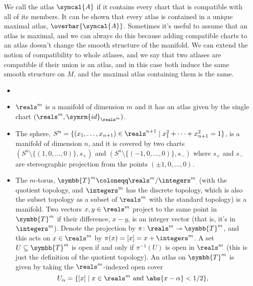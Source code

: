 \documentclass[fleqn]{NotesClass}
\newcommand{\id}{\symrm{id}}
\newcommand{\atlas}{\symcal{A}}
\newcommand{\torus}{\symbb{T}}
\begin{document}
    We call the atlas \(\atlas\)  if it contains every chart that is compatible with all of its members.
    It can be shown that every atlas is contained in a unique maximal atlas, \(\overbar{\atlas}\).
    Sometimes it's useful to assume that an atlas is maximal, and we can always do this because adding compatible charts to an atlas doesn't change the smooth structure of the manifold.
    We can extend the notion of compatibility to whole atlases, and we say that two atlases are compatible if their union is an atlas, and in this case both induce the same smooth structure on \(M\), and the maximal atlas containing them is the same.
    
    \begin{exm}{}{}
        \begin{itemize}
            \item \item \(\reals^m\) is a manifold of dimension \(m\) and it has an atlas given by the single chart \((\reals^m, \id_{\reals^m})\).
            \item The sphere, \(S^n = \{(x_1, \dotsc, x_{n + 1}) \in \reals^{n+1} \mid x_1^2 + \dotsb + x_{n+1}^2 = 1\}\), is a manifold of dimension \(n\), and it is covered by two charts \((S^n \setminus \{(1, 0, \dotsc, 0)\}, s_+)\) and \((S^n \setminus \{(-1, 0, \dotsc, 0)\}, s_-)\) where \(s_+\) and \(s_-\) are stereographic projection from the points \((\pm 1, 0, \dotsc, 0)\).
            \item The \(m\)-torus, \(\torus^m \coloneqq \reals^m/\integers^m\) (with the quotient topology, and \(\integers^m\) has the discrete topology, which is also the subset topology as a subset of \(\reals^m\) with the standard topology) is a manifold.
            Two vectors \(x, y \in \reals^m\) project to the same point in \(\torus^m\) if their difference, \(x - y\), is an integer vector (that is, it's in \(\integers^m\)).
            Denote the projection by \(\pi \colon \reals^m \twoheadrightarrow \torus^m\), and this acts on \(x \in \reals^m\) by \(\pi(x) = [x] = x + \integers^m\).
            A set \(U \subseteq \torus^m\) is open if and only if \(\pi^{-1}(U)\) is open in \(\reals^m\) (this is just the definition of the quotient topology).
            An atlas on \(\torus^m\) is given by taking the \(\reals^m\)-indexed open cover
            \begin{equation}
                U_\alpha = \{[x] \mid x \in \reals^m \text{ and } \abs{x - \alpha} < 1/2\},
            \end{equation}

\end{itemize}
\end{exm}
\end{document}
